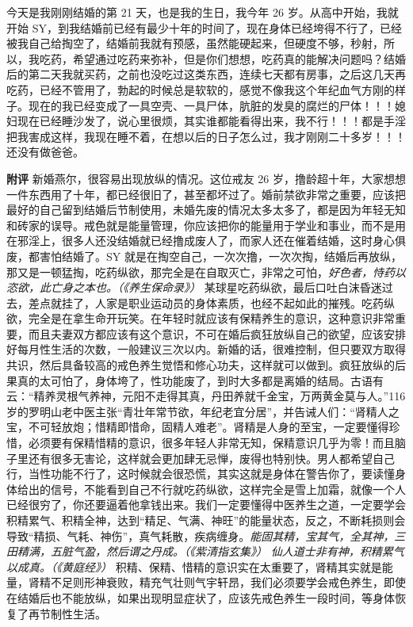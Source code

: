 \begin{case}
    今天是我刚刚结婚的第 21 天，也是我的生日，我今年 26 岁。从高中开始，我就开始 SY，到我结婚前已经有最少十年的时间了，现在身体已经垮得不行了，已经被我自己给掏空了，结婚前我就有预感，虽然能硬起来，但硬度不够，秒射，所以，我吃药，希望通过吃药来弥补，但是你们想想，吃药真的能解决问题吗？结婚后的第二天我就买药，之前也没吃过这类东西，连续七天都有房事，之后这几天再吃药，已经不管用了，勃起的时候总是软软的，感觉不像我这个年纪血气方刚的样子。现在的我已经变成了一具空壳、一具尸体，肮脏的发臭的腐烂的尸体！！！媳妇现在已经睡沙发了，说心里很烦，其实谁都能看得出来，我不行！！！都是手淫把我害成这样，我现在睡不着，在想以后的日子怎么过，我才刚刚二十多岁！！！还没有做爸爸。

    \textbf{附评} 新婚燕尔，很容易出现放纵的情况。这位戒友 26 岁，撸龄超十年，大家想想一件东西用了十年，都已经很旧了，甚至都坏过了。婚前禁欲非常之重要，应该把最好的自己留到结婚后节制使用，未婚先废的情况太多太多了，都是因为年轻无知和砖家的误导。戒色就是能量管理，你应该把你的能量用于学业和事业，而不是用在邪淫上，很多人还没结婚就已经撸成废人了，而家人还在催着结婚，这时身心俱废，都害怕结婚了。SY 就是在掏空自己，一次次撸，一次次掏，结婚后再放纵，那又是一顿猛掏，吃药纵欲，那完全是在自取灭亡，非常之可怕，\textit{好色者，恃药以恣欲，此亡身之本也。（《养生保命录》）} 某球星吃药纵欲，最后口吐白沫昏迷过去，差点就挂了，人家是职业运动员的身体素质，也经不起如此的摧残。吃药纵欲，完全是在拿生命开玩笑。在年轻时就应该有保精养生的意识，这种意识非常重要，而且夫妻双方都应该有这个意识，不可在婚后疯狂放纵自己的欲望，应该安排好每月性生活的次数，一般建议三次以内。新婚的话，很难控制，但只要双方取得共识，然后具备较高的戒色养生觉悟和修心功夫，这样就可以做到。疯狂放纵的后果真的太可怕了，身体垮了，性功能废了，到时大多都是离婚的结局。古语有云：“精养灵根气养神，元阳不走得其真，丹田养就千金宝，万两黄金莫与人。”116 岁的罗明山老中医主张“青壮年常节欲，年纪老宜分居”，并告诫人们：“肾精人之宝，不可轻放炮；惜精即惜命，固精人难老”。肾精是人身的至宝，一定要懂得珍惜，必须要有保精惜精的意识，很多年轻人非常无知，保精意识几乎为零！而且脑子里还有很多无害论，这样就会更加肆无忌惮，废得也特别快。男人都希望自己行，当性功能不行了，这时候就会很恐慌，其实这就是身体在警告你了，要读懂身体给出的信号，不能看到自己不行就吃药纵欲，这样完全是雪上加霜，就像一个人已经很穷了，你还要逼着他拿钱出来。我们一定要懂得中医养生之道，一定要学会积精累气、积精全神，达到“精足、气满、神旺”的能量状态，反之，不断耗损则会导致“精损、气耗、神伤”，真气耗散，疾病缠身。\textit{能固其精，宝其气，全其神，三田精满，五脏气盈，然后谓之丹成。（《紫清指玄集》）} \textit{仙人道士非有神，积精累气以成真。（《黄庭经》）} 积精、保精、惜精的意识实在太重要了，肾精其实就是能量，肾精不足则形神衰败，精充气壮则气宇轩昂，我们必须要学会戒色养生，即使在结婚后也不能放纵，如果出现明显症状了，应该先戒色养生一段时间，等身体恢复了再节制性生活。
\end{case}

